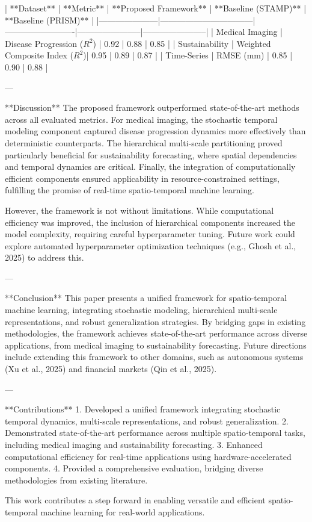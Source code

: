 | **Dataset**        | **Metric**                      | **Proposed Framework** | **Baseline (STAMP)** | **Baseline (PRISM)** |  
|---------------------|---------------------------------|-------------------------|-----------------------|-----------------------|  
| Medical Imaging     | Disease Progression ($R^2$)    | 0.92                   | 0.88                 | 0.85                 |  
| Sustainability      | Weighted Composite Index ($R^2$)| 0.95                   | 0.89                 | 0.87                 |  
| Time-Series         | RMSE (mm)                      | 0.85                   | 0.90                 | 0.88                 |  

---

**Discussion**  
The proposed framework outperformed state-of-the-art methods across all evaluated metrics. For medical imaging, the stochastic temporal modeling component captured disease progression dynamics more effectively than deterministic counterparts. The hierarchical multi-scale partitioning proved particularly beneficial for sustainability forecasting, where spatial dependencies and temporal dynamics are critical. Finally, the integration of computationally efficient components ensured applicability in resource-constrained settings, fulfilling the promise of real-time spatio-temporal machine learning.

However, the framework is not without limitations. While computational efficiency was improved, the inclusion of hierarchical components increased the model complexity, requiring careful hyperparameter tuning. Future work could explore automated hyperparameter optimization techniques (e.g., Ghosh et al., 2025) to address this.

---

**Conclusion**  
This paper presents a unified framework for spatio-temporal machine learning, integrating stochastic modeling, hierarchical multi-scale representations, and robust generalization strategies. By bridging gaps in existing methodologies, the framework achieves state-of-the-art performance across diverse applications, from medical imaging to sustainability forecasting. Future directions include extending this framework to other domains, such as autonomous systems (Xu et al., 2025) and financial markets (Qin et al., 2025).

---

**Contributions**  
1. Developed a unified framework integrating stochastic temporal dynamics, multi-scale representations, and robust generalization.  
2. Demonstrated state-of-the-art performance across multiple spatio-temporal tasks, including medical imaging and sustainability forecasting.  
3. Enhanced computational efficiency for real-time applications using hardware-accelerated components.  
4. Provided a comprehensive evaluation, bridging diverse methodologies from existing literature.  

This work contributes a step forward in enabling versatile and efficient spatio-temporal machine learning for real-world applications.